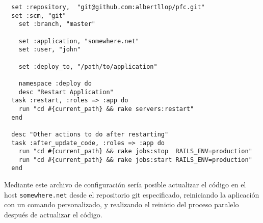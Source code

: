 \begin{verbatim}
  set :repository,  "git@github.com:albertllop/pfc.git"
  set :scm, "git"
	set :branch, "master"
	
	set :application, "somewhere.net"
	set :user, "john"
	
	set :deploy_to, "/path/to/application"
	
	namespace :deploy do
	desc "Restart Application"
  task :restart, :roles => :app do
    run "cd #{current_path} && rake servers:restart"
  end
  
  desc "Other actions to do after restarting"
  task :after_update_code, :roles => :app do
    run "cd #{current_path} && rake jobs:stop  RAILS_ENV=production"
    run "cd #{current_path} && rake jobs:start RAILS_ENV=production"
  end
\end{verbatim}

Mediante este archivo de configuración sería posible actualizar el código en el host \texttt{somewhere.net} desde el repositorio git especificado, reiniciando la aplicación con un comando personalizado, y realizando el reinicio del proceso paralelo después de actualizar el código.


